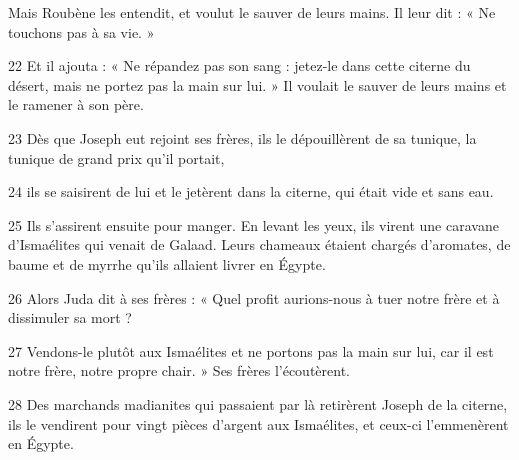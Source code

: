 Mais Roubène les entendit, et voulut le sauver de leurs mains. Il leur dit : « Ne touchons pas à sa vie. »

22 Et il ajouta : « Ne répandez pas son sang : jetez-le dans cette citerne du désert, mais ne portez pas la main sur lui. » Il voulait le sauver de leurs mains et le ramener à son père.

23 Dès que Joseph eut rejoint ses frères, ils le dépouillèrent de sa tunique, la tunique de grand prix qu’il portait,

24 ils se saisirent de lui et le jetèrent dans la citerne, qui était vide et sans eau.

25 Ils s’assirent ensuite pour manger. En levant les yeux, ils virent une caravane d’Ismaélites qui venait de Galaad. Leurs chameaux étaient chargés d’aromates, de baume et de myrrhe qu’ils allaient livrer en Égypte.

26 Alors Juda dit à ses frères : « Quel profit aurions-nous à tuer notre frère et à dissimuler sa mort ?

27 Vendons-le plutôt aux Ismaélites et ne portons pas la main sur lui, car il est notre frère, notre propre chair. » Ses frères l’écoutèrent.

28 Des marchands madianites qui passaient par là retirèrent Joseph de la citerne, ils le vendirent pour vingt pièces d’argent aux Ismaélites, et ceux-ci l’emmenèrent en Égypte.